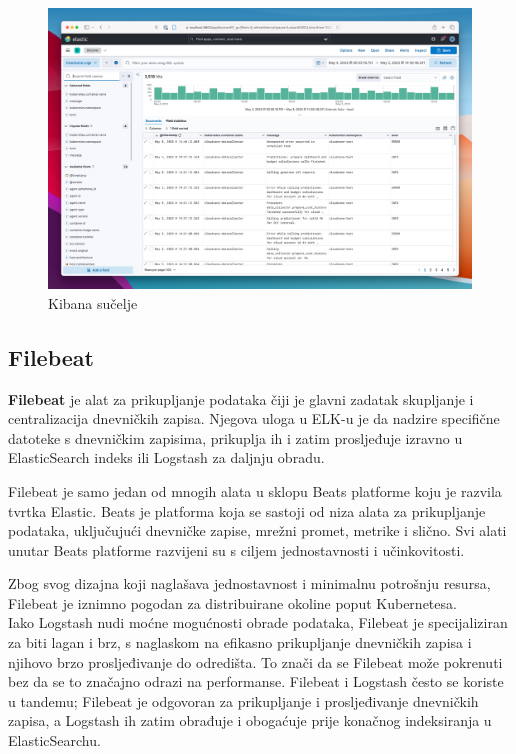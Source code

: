 \documentclass[times, utf8, diplomski]{fer}
\begin{document}
\begin{figure}[htb]
	\centering
	\includegraphics[width=15cm]{images/elastic-logs.jpeg}
	\caption[Kibana sučelje]{Kibana sučelje}
	\label{fig:kibana}
\end{figure}

\subsection{Filebeat}
\label{sec:filebeat}

\textbf{Filebeat} je alat za prikupljanje podataka čiji je glavni zadatak skupljanje i centralizacija dnevničkih zapisa. Njegova uloga u ELK-u je da nadzire specifične datoteke s dnevničkim zapisima, prikuplja ih i zatim prosljeđuje izravno u ElasticSearch indeks ili Logstash za daljnju obradu. 

Filebeat je samo jedan od mnogih alata u sklopu Beats platforme koju je razvila tvrtka Elastic. Beats je platforma koja se sastoji od niza alata za prikupljanje podataka, uključujući dnevničke zapise, mrežni promet, metrike i slično. Svi alati unutar Beats platforme razvijeni su s ciljem jednostavnosti i učinkovitosti. 

Zbog svog dizajna koji naglašava jednostavnost i minimalnu potrošnju resursa, Filebeat je iznimno pogodan za distribuirane okoline poput Kubernetesa.\\

Iako Logstash nudi moćne mogućnosti obrade podataka, Filebeat je specijaliziran za biti lagan i brz, s naglaskom na efikasno prikupljanje dnevničkih zapisa i njihovo brzo prosljeđivanje do odredišta. To znači da se Filebeat može pokrenuti bez da se to značajno odrazi na performanse. Filebeat i Logstash često se koriste u tandemu; Filebeat je odgovoran za prikupljanje i prosljeđivanje dnevničkih zapisa, a Logstash ih zatim obrađuje i obogaćuje prije konačnog indeksiranja u ElasticSearchu.\\
\end{document}
